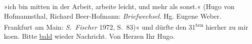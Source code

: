 \begin{ledgroupsized}[t]{13cm}
{{{                     »ich bin mitten in der Arbeit, arbeite leicht, und mehr als
                     sonst.« (Hugo von Hofmannsthal, Richard Beer-Hofmann: \emph{Briefwechsel}. Hg. Eugene Weber. Frankfurt am Main:
                        \emph{S. Fischer} 1972, S. 83)}}}\label{K_L00838_1h}« und dürfte den
                     31\textsuperscript{ten} hierher zu mir ko{\geminationm}en. Bitte \uline{bald} wieder Nachricht. Von Herzen Ihr \spacefill\mbox{Hugo.}\pend
           \endnumbering{}\end{ledgroupsized}  \newcommand{\dateiname}{L00838}\newcommand{\titel}{Hugo von Hofmannsthal an Arthur Schnitzler, 25. 8. 1898}\newcommand{\editorInnen}{Martin Anton Müller und Gerd-Hermann Susen}
            \footnotesize
\begin{ledgroupsized}[t]{11.5cm}
\end{ledgroupsized}
         
      